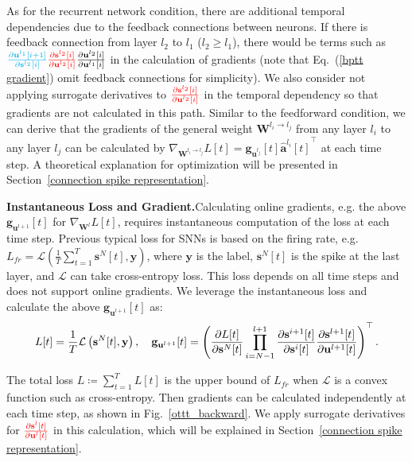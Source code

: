 \documentclass{article}
\begin{document}
As for the recurrent network condition, there are additional temporal dependencies due to the feedback connections between neurons. If there is feedback connection from layer $l_2$ to $l_1$ ($l_2\geq l_1$), there would be terms such as ${\color{cyan}\frac{\partial \mathbf{u}^{l_1}[i+1]}{\partial \mathbf{s}^{l_2}[i]}}{\color{red}\frac{\partial \mathbf{s}^{l_2}[i]}{\partial \mathbf{u}^{l_2}[i]}}\frac{\partial \mathbf{u}^{l_2}[i]}{\partial \mathbf{u}^{l_1}[i]}$ in the calculation of gradients (note that Eq.~(\ref{bptt gradient}) omit feedback connections for simplicity). We also consider not applying surrogate derivatives to ${\color{red}\frac{\partial \mathbf{s}^{l_2}[i]}{\partial \mathbf{u}^{l_2}[i]}}$ in the temporal dependency so that gradients are not calculated in this path. Similar to the feedforward condition, we can derive that the gradients of the general weight $\mathbf{W}^{l_i\rightarrow l_j}$ from any layer $l_i$ to any layer $l_j$ can be calculated by $\nabla_{\mathbf{W}^{l_i\rightarrow l_j}}L[t]=\mathbf{g}_{\mathbf{u}^{l_j}}[t]{\hat{\mathbf{a}}^{l_i}[t]}^\top$ at each time step. 
A theoretical explanation for optimization will be presented in Section~\ref{connection spike representation}. 

\textbf{Instantaneous Loss and Gradient.}\quad Calculating online gradients, e.g. the above $\mathbf{g}_{\mathbf{u}^{l+1}}[t]$ for $\nabla_{\mathbf{W}^l}L[t]$, requires instantaneous computation of the loss at each time step. Previous typical loss for SNNs is based on the firing rate, e.g. $L_{fr}=\mathcal{L}\left(\frac{1}{T}\sum_{t=1}^T\mathbf{s}^N[t], \mathbf{y}\right)$, where $\mathbf{y}$ is the label, $\mathbf{s}^N[t]$ is the spike at the last layer, and $\mathcal{L}$ can take cross-entropy loss. This loss depends on all time steps and does not support online gradients. We leverage the instantaneous loss and calculate the above $\mathbf{g}_{\mathbf{u}^{l+1}}[t]$ as: 
\vspace{-1mm}
\begin{equation}
    L[t]=\frac{1}{T}\mathcal{L}\left(\mathbf{s}^N[t], \mathbf{y}\right),\quad \mathbf{g}_{\mathbf{u}^{l+1}}[t]=\left(\frac{\partial L[t]}{\partial \mathbf{s}^N[t]}\prod_{i=N-1}^{l+1}\frac{\partial \mathbf{s}^{i+1}[t]}{\partial \mathbf{s}^i[t]} \frac{\partial \mathbf{s}^{l+1}[t]}{\partial \mathbf{u}^{l+1}[t]}\right)^\top.
    \label{instantaneous loss}
\vspace{-2mm}
\end{equation}

The total loss $L\coloneqq\sum_{t=1}^TL[t]$ is the upper bound of $L_{fr}$ when $\mathcal{L}$ is a convex function such as cross-entropy. Then gradients can be calculated independently at each time step, as shown in Fig.~\ref{ottt_backward}. We apply surrogate derivatives for ${\color{red}\frac{\partial \mathbf{s}^{l}[t]}{\partial \mathbf{u}^{l}[t]}}$ in this calculation, which will be explained in Section~\ref{connection spike representation}.
\end{document}
